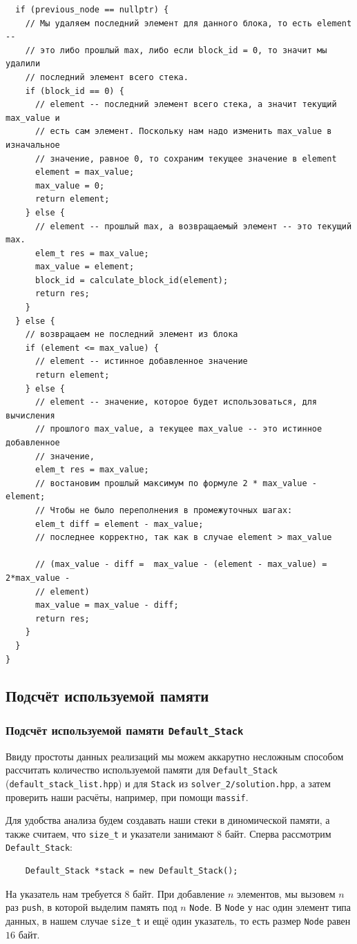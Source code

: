 \begin{verbatim}
  if (previous_node == nullptr) {
    // Мы удаляем последний элемент для данного блока, то есть element --
    // это либо прошлый max, либо если block_id = 0, то значит мы удалили
    // последний элемент всего стека.
    if (block_id == 0) {
      // element -- последний элемент всего стека, а значит текущий max_value и
      // есть сам элемент. Поскольку нам надо изменить max_value в изначальное
      // значение, равное 0, то сохраним текущее значение в element
      element = max_value;
      max_value = 0;
      return element;
    } else {
      // element -- прошлый max, а возвращаемый элемент -- это текущий max.
      elem_t res = max_value;
      max_value = element;
      block_id = calculate_block_id(element);
      return res;
    }
  } else {
    // возвращаем не последний элемент из блока
    if (element <= max_value) {
      // element -- истинное добавленное значение
      return element;
    } else {
      // element -- значение, которое будет использоваться, для вычисления
      // прошлого max_value, а текущее max_value -- это истинное добавленное
      // значение,
      elem_t res = max_value;
      // востановим прошлый максимум по формуле 2 * max_value - element;
      // Чтобы не было переполнения в промежуточных шагах:
      elem_t diff = element - max_value;
      // последнее корректно, так как в случае element > max_value

      // (max_value - diff =  max_value - (element - max_value) = 2*max_value -
      // element)
      max_value = max_value - diff;
      return res;
    }
  }
}
\end{verbatim}

\subsection{Подсчёт используемой памяти}
\subsubsection{Подсчёт используемой памяти \texttt{Default_Stack}}
Ввиду простоты данных реализаций мы можем аккарутно несложным способом рассчитать количество используемой памяти для \texttt{Default_Stack} (\texttt{default_stack_list.hpp}) и для \texttt{Stack} из \texttt{solver_2/solution.hpp}, а затем проверить наши расчёты, например, при помощи \texttt{massif}. 

Для удобства анализа будем создавать наши стеки в диномической памяти, а также считаем, что \texttt{size_t} и указатели занимают \(8\) байт. Сперва рассмотрим \texttt{Default_Stack}:
\begin{verbatim}
    Default_Stack *stack = new Default_Stack();
\end{verbatim}
На указатель нам требуется \(8\) байт. При добавление \(n\) элементов, мы вызовем \(n\) раз \texttt{push}, в которой выделим память под \(n\) \texttt{Node}. В \texttt{Node} у нас один элемент типа данных, в нашем случае \texttt{size_t} и ещё один указатель, то есть размер \texttt{Node} равен \(16\) байт. 

